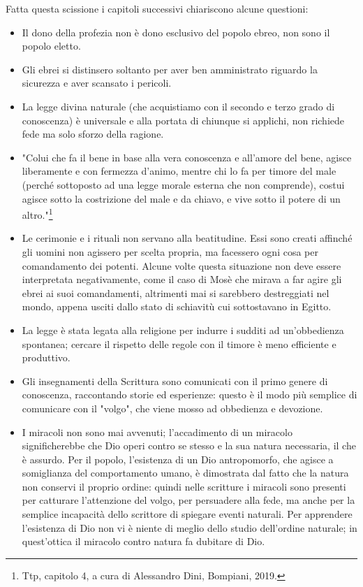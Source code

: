Fatta questa scissione i capitoli successivi chiariscono alcune questioni:

\begin{itemize}
	\item Il dono della profezia non è dono esclusivo del popolo ebreo, non sono il popolo eletto.
	\item Gli ebrei  si distinsero soltanto per aver ben amministrato riguardo la sicurezza e aver scansato i pericoli.
	\item  La legge divina naturale (che acquistiamo con il secondo e terzo grado di conoscenza) è universale e alla portata di chiunque si applichi, non richiede fede ma solo sforzo della ragione.
	\item "Colui che fa il bene in base alla vera conoscenza e all'amore del bene, agisce liberamente e con fermezza d'animo, mentre chi lo fa per timore del male (perché sottoposto ad una legge morale esterna che non comprende), costui agisce sotto la costrizione del male e da chiavo, e vive sotto il potere di un altro."\footnote{Ttp, capitolo 4, a cura di Alessandro Dini, Bompiani, 2019.}
	\item Le cerimonie e i rituali non servano alla beatitudine. Essi sono creati affinché gli uomini non agissero per scelta propria, ma facessero ogni cosa per comandamento dei potenti. Alcune volte questa situazione non deve essere interpretata negativamente, come il caso di Mosè che mirava a far agire gli ebrei ai suoi comandamenti, altrimenti mai si sarebbero destreggiati nel mondo, appena usciti dallo stato di schiavitù cui sottostavano in Egitto.
	\item La legge è stata legata alla religione per indurre i sudditi ad un'obbedienza spontanea; cercare il rispetto delle regole con il timore è meno efficiente e produttivo.
	\item Gli insegnamenti della Scrittura sono comunicati con il primo genere di conoscenza, raccontando storie ed esperienze: questo è il modo più semplice di comunicare con il "volgo", che viene mosso ad obbedienza e devozione.
	\item I miracoli non sono mai avvenuti; l'accadimento di un miracolo significherebbe che Dio operi contro se stesso e la sua natura necessaria, il che è assurdo. Per il popolo, l'esistenza di un Dio antropomorfo, che agisce a somiglianza del comportamento umano, è dimostrata dal fatto che la natura non conservi il proprio ordine: quindi nelle scritture i miracoli sono presenti per catturare l'attenzione del volgo, per persuadere alla fede, ma anche per la semplice incapacità dello scrittore di spiegare eventi naturali. Per apprendere l'esistenza di Dio non vi è niente di meglio dello studio dell'ordine naturale; in quest'ottica il miracolo contro natura fa dubitare di Dio.
\end{itemize}


